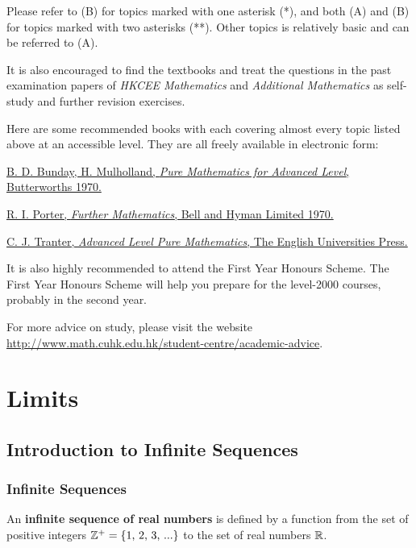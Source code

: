 \documentclass[a4paper,12pt]{article}
\begin{document}
Please refer to (B) for topics marked with one asterisk (*), and both (A) and (B) for topics marked with two asterisks (**). Other topics is relatively basic and can be referred to (A).\n

It is also encouraged to find the textbooks and treat the questions in the past examination papers of \textit{HKCEE Mathematics} and \textit{Additional Mathematics} as self-study and further revision exercises.\n

Here are some recommended books with each covering almost every topic listed above at an accessible level. They are all freely available in electronic form:
\begin{rlist}
  \item \href{https://archive.org/details/PureMathematicsForAdvancedLevel}{B. D. Bunday, H. Mulholland, \textit{Pure Mathematics for Advanced Level}, Butterworths 1970.}
  \item \href{https://archive.org/details/FurtherMathematics}{R. I. Porter, \textit{Further Mathematics}, Bell and Hyman Limited 1970.}
  \item \href{https://archive.org/details/in.ernet.dli.2015.285850}{C. J. Tranter, \textit{Advanced Level Pure Mathematics}, The English Universities Press.}
\end{rlist}

It is also highly recommended to attend the First Year Honours Scheme. The First Year Honours Scheme will help you prepare for the level-2000 courses, probably in the second year.\n

For more advice on study, please visit the website \url{http://www.math.cuhk.edu.hk/student-centre/academic-advice}.

\pagebreak

\fancyhead[R]{\nouppercase \lastrightmark}
\section{Limits}
\subsection{Introduction to Infinite Sequences}
\subsubsection{Infinite Sequences}
\begin{dft}
  An \textbf{infinite sequence of real numbers} is defined by a function from the set of positive integers $\mathbb{Z}^{+}=\left\{ 1\text{, }2\text{, }3\text{, ...}\right\}$ to the set of real numbers $\mathbb{R}$.
\end{dft}
\end{document}
